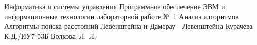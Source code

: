 \documentclass{bmstu}[a4paper]
\begin{document}
	
	\makereporttitle
	{Информатика и системы управления}
	{Программное обеспечение ЭВМ и информационные технологии}
	{лабораторной работе №~1}
	{Анализ алгоритмов}
	{Алгоритмы поиска расстояний Левенштейна и Дамерау---Левенштейна}
	{}
	{Курачева К.Д./ИУ7-53Б}
	{Волкова~Л.~Л.}
	
	\maketableofcontents
	
	
	
	
	
	
	
	
	\makebibliography
	
	
	
	
\end{document}
